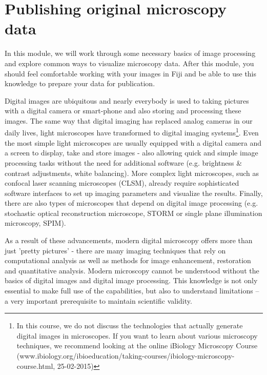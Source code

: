 \chapter{Publishing original microscopy data}

In this module, we will work through some necessary basics of image processing and explore common ways to visualize microscopy data. After this module, you should feel comfortable working with your images in Fiji and be able to use this knowledge to prepare your data for publication.

Digital images are ubiquitous and nearly everybody is used to taking pictures with a digital camera or smart-phone and also storing and processing these images. The same way that digital imaging has replaced analog cameras in our daily lives, light microscopes have transformed to digital imaging systems\footnote{In this course, we do not discuss the technologies that actually generate digital images in microscopes. If you want to learn about various microscopy techniques, we recommend looking at the online iBiology Microscopy Course (www.ibiology.org/ibioeducation/taking-courses/ibiology-microscopy-course.html, 25-02-2015)}. Even the most simple light microscopes are usually equipped with a digital camera and a screen to display, take and store images - also allowing quick and simple image processing tasks without the need for additional software (e.g. brightness \& contrast adjustments, white balancing). More complex light microscopes, such as confocal laser scanning microscopes (CLSM), already require sophisticated software interfaces to set up imaging parameters and visualize the results. Finally, there are also types of microscopes that depend on digital image processing (e.g. stochastic optical reconstruction microscope, STORM or single plane illumination microscopy, SPIM).

As a result of these advancements, modern digital microscopy offers more than just 'pretty pictures' - there are many imaging techniques that rely on computational analysis as well as methods for image enhancement, restoration and quantitative analysis. Modern microscopy cannot be understood without the basics of digital images and digital image processing. This knowledge is not only essential to make full use of the capabilities, but also to understand limitations -- a very important prerequisite to maintain scientific validity.

